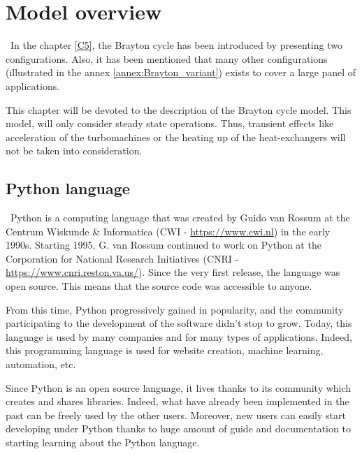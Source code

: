 \graphicspath{{Chapitre_6/Images/}}
\chapter{Model overview}\label{C6}
\quad\, In the chapter \ref{C5}, the Brayton cycle has been introduced by presenting two configurations. Also, it has been mentioned that many other configurations (illustrated in the annex \ref{annex:Brayton_variant}) exists to cover a large panel of applications. 

This chapter will be devoted to the description of the  Brayton cycle model. This model, will only consider steady state operations. Thus, transient effects like acceleration of the turbomachines or the heating up of the heat-exchangers will not be taken into consideration.
 

\section{Python language}
\quad\, Python is a computing language that was created by Guido van Rossum at the Centrum Wiskunde \& Informatica (CWI - \url{https://www.cwi.nl}) in the early 1990s. Starting 1995, G. van Rossum continued to work on Python at the Corporation for National Research Initiatives (CNRI - \url{https://www.cnri.reston.va.us/}). Since the very first release, the language was open source. This means that the source code was accessible to anyone. 

From this time, Python progressively gained in popularity, and the community participating to the development of the software didn't stop to grow. Today, this language is used by many companies and for many types of applications. Indeed, this programming language is used for website creation, machine learning, automation, etc. 

Since Python is an open source language, it lives thanks to its community which creates and shares libraries. Indeed, what have already been implemented in the past can be freely used by the other users. Moreover, new users can easily start developing under Python thanks to huge amount of guide and documentation to starting learning about the Python language.

